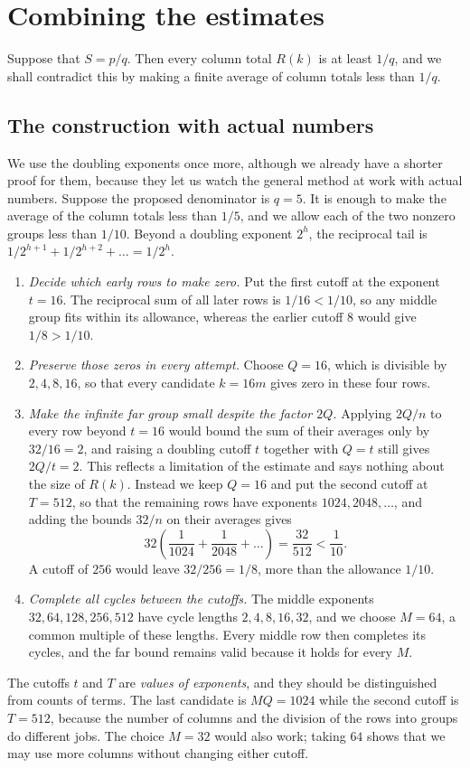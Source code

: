 \documentclass[10pt]{article}
\theoremstyle{plain}
\theoremstyle{definition}
\theoremstyle{remark}
\begin{document}
\section{Combining the estimates}\label{sec:proof}

Suppose that $S=p/q$. Then every column total $R(k)$ is at least
$1/q$, and we shall contradict this by making a finite average of
column totals less than $1/q$.

\subsection{The construction with actual numbers}\label{app:numbers}

We use the doubling exponents once more, although we already have a
shorter proof for them, because they let us watch the general method at
work with actual numbers. Suppose the proposed denominator is $q=5$. It
is enough to make the average of the column totals less than $1/5$, and
we allow each of the two nonzero groups less than $1/10$. Beyond a
doubling exponent $2^h$, the reciprocal tail is
$1/2^{h+1}+1/2^{h+2}+\dots=1/2^h$.
\begin{enumerate}
\item \emph{Decide which early rows to make zero.}
 Put the first cutoff at the exponent $t=16$. The reciprocal sum of all
 later rows is $1/16<1/10$, so any middle group fits within its
 allowance, whereas the earlier cutoff $8$ would give $1/8>1/10$.
\item \emph{Preserve those zeros in every attempt.}
 Choose $Q=16$, which is divisible by $2,4,8,16$, so that every
 candidate $k=16m$ gives zero in these four rows.
\item \emph{Make the infinite far group small despite the factor $2Q$.}
 Applying $2Q/n$ to every row beyond $t=16$ would bound the sum of
 their averages only by $32/16=2$, and raising a doubling cutoff $t$
 together with $Q=t$ still gives $2Q/t=2$. This reflects a limitation of
 the estimate and says nothing about the size of $R(k)$. Instead we keep
 $Q=16$ and put the second cutoff at $T=512$, so that the remaining rows
 have exponents $1024,2048,\dots$, and adding the bounds $32/n$ on their
 averages gives
 \[
  32\left(\frac1{1024}+\frac1{2048}+\dots\right)
  =\frac{32}{512}<\frac1{10}.
 \]
 A cutoff of $256$ would leave $32/256=1/8$, more than the allowance
 $1/10$.
\item \emph{Complete all cycles between the cutoffs.}
 The middle exponents $32,64,128,256,512$ have cycle lengths
 $2,4,8,16,32$, and we choose $M=64$, a common multiple of these
 lengths. Every middle row then completes its cycles, and the far bound
 remains valid because it holds for every $M$.
\end{enumerate}
The cutoffs $t$ and $T$ are \emph{values of exponents}, and they
should be distinguished from counts of terms. The last candidate is
$MQ=1024$ while the second cutoff is $T=512$, because the number of
columns and the division of the rows into groups do different jobs. The
choice $M=32$ would also work; taking $64$ shows that we may use more
columns without changing either cutoff.
\end{document}
